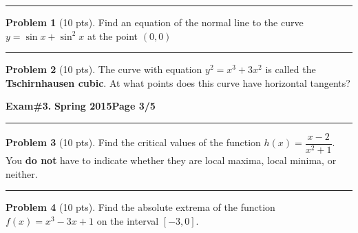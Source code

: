 \documentclass[12pt]{article}
\theoremstyle{definition}
\newtheorem{problem}{Problem}
\begin{document}
\hrule

\begin{problem}[10 pts]
Find an equation of the normal line to the curve $y=\sin x + \sin^2 x$ at the point $(0,0)$

\vspace{5cm}

\begin{flushright}
\end{flushright}
\end{problem}

\hrule

\begin{problem}[10 pts]
The curve with equation $y^2=x^3+3x^2$ is called the \textbf{Tschirnhausen cubic}.  At what points does this curve have horizontal tangents?

\vspace{5cm}

\begin{flushright}
\end{flushright}
\end{problem}

\newpage

\hfill{\large\bf Exam\#3.}\hfill{\large\bf
  Spring 2015}\hfill{\large\bf Page 3/5}\hrule

\bigskip
\begin{problem}[10 pts]
Find the critical values of the function $h(x)=\dfrac{x-2}{x^2+1}$.  You \textbf{do not} have to indicate whether they are local maxima, local minima, or neither.

\vspace{10cm}

\begin{flushright}
\end{flushright}
\end{problem}
\hrule
\begin{problem}[10 pts]
Find the absolute extrema of the function $f(x)=x^3-3x+1$ on the interval $[-3,0]$.

\vspace{5cm}
\begin{center}
\end{center}
\end{problem}
\newpage
\end{document}
